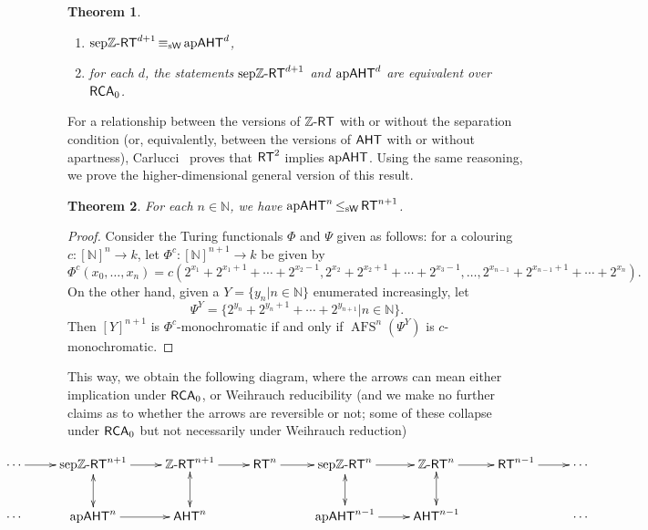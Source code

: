 \documentclass[11pt]{amsart}
\newcommand{\rt}{\mathnormal{\mathsf{RT}}}
\newcommand{\zrt}{\mathnormal{\mathbb Z\text{-}\mathsf{RT}}}
\newcommand{\aht}{\mathnormal{\mathsf{AHT}}}
\newcommand{\apaht}{\mathnormal{\mathrm{ap}\mathsf{AHT}}}
\newcommand{\sepzrt}{\mathnormal{\mathrm{sep}\mathbb Z\text{-}\mathsf{RT}}}
\newcommand{\rca}{\mathnormal{\mathsf{RCA}}_0}
\newcommand{\weisleq}{\mathop{\leq_{\mathrm{s}\mathsf{W}}}}
\newcommand{\weiseq}{\mathop{\equiv_{\mathrm{s}\mathsf{W}}}}
\DeclareMathOperator{\afs}{AFS}
\newtheorem{theorem}{Theorem}%
\theoremstyle{definition}
\begin{document}
\begin{theorem}\label{adj-zrtversusaht}\hfill
\begin{enumerate}
\item $\sepzrt^{d+1}\weiseq\apaht^d$,
\item for each $d$, the statements $\sepzrt^{d+1}$ and $\apaht^d$ are equivalent over $\rca$.
\end{enumerate}
\end{theorem}

For a relationship between the versions of $\zrt$ with or without the separation condition (or, equivalently, between the versions of $\aht$ with or without apartness), Carlucci~\cite{carlucci-adjacent} proves that $\rt^2$ implies $\apaht$. Using the same reasoning, we prove the higher-dimensional general version of this result.

\begin{theorem}
For each $n\in\mathbb N$, we have $\apaht^n\weisleq\rt^{n+1}$.
\end{theorem}

\begin{proof}
Consider the Turing functionals $\Phi$ and $\Psi$ given as follows: for a colouring $c:[\mathbb N]^n\longrightarrow k$, let $\Phi^c:[\mathbb N]^{n+1}\longrightarrow k$ be given by
\begin{equation*}
\Phi^c(x_0,\ldots,x_n)=c(2^{x_1}+2^{x_1+1}+\cdots+2^{x_2-1},2^{x_2}+2^{x_2+1}+\cdots+2^{x_3-1},\ldots,2^{x_{n-1}}+2^{x_{n-1}+1}+\cdots+2^{x_n}).
\end{equation*}
On the other hand, given a $Y=\{y_n\big|n\in\mathbb N\}$ enumerated increasingly, let 
\begin{equation*}
\Psi^Y=\{2^{y_n}+2^{y_n+1}+\cdots+2^{y_{n+1}}\big|n\in\mathbb N\}.
\end{equation*}
Then $[Y]^{n+1}$ is $\Phi^c$-monochromatic if and only if $\afs^n(\Psi^Y)$ is $c$-monochromatic.
\end{proof}

This way, we obtain the following diagram, where the arrows can mean either implication under $\rca$, or Weihrauch reducibility (and we make no further claims as to whether the arrows are reversible or not; some of these collapse under $\rca$ but not necessarily under Weihrauch reduction)

\begin{equation*}
\centerline{\xymatrix{
\cdots \ar@{->}[r] & \sepzrt^{n+1} \ar@{->}[r] \ar@{<->}[d] & \zrt^{n+1} \ar@{->}[r] \ar@{<->}[d] & \rt^n \ar@{->}[r] & \sepzrt^n \ar@{->}[r] \ar@{<->}[d] & \zrt^n \ar@{->}[r] \ar@{<->}[d] & \rt^{n-1} \ar@{->}[r] & \cdots \\
\cdots & \apaht^n \ar@{->}[r] & \aht^n &  & \apaht^{n-1} \ar@{->}[r] & \aht^{n-1} &  & \cdots 
}}
\end{equation*}
\end{document}
